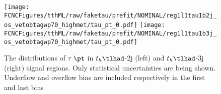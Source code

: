 \begin{figure}[H]
\centering
\texttt{[image: \\FCNCFigures/tthML/raw/faketau/prefit/NOMINAL/reg1l1tau1b2j\_os\_vetobtagwp70\_highmet/tau\_pt\_0.pdf]}
\texttt{[image: \\FCNCFigures/tthML/raw/faketau/prefit/NOMINAL/reg1l1tau1b3j\_os\_vetobtagwp70\_highmet/tau\_pt\_0.pdf]}

\caption{ The distributions of $\tau$ $\pt$ in $t_h\tlhad$-2j (left) and $t_h\tlhad$-3j (right) signal regions. Only
statistical uncertainties are being shown. Underflow and overflow bins are included respectively in the first and last bins }
\label{fig:intro_pt_raw}
\end{figure}

